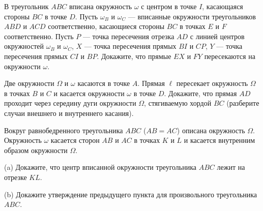 \newpage

\hspace{3mm}

В треугольник $ABC$ вписана окружность $\omega$ с центром в точке $I$,
касающаяся стороны $BC$ в точке $D$. Пусть $\omega_B$ и $\omega_C$ —
вписанные окружности треугольников $ABD$ и $ACD$ соответственно,
касающиеся стороны $BC$ в точках $E$ и $F$ соответственно. Пусть $P$ —
точка пересечения отрезка $AD$ с линией центров окружностей $\omega_B$ и
$\omega_C$, $X$ — точка пересечения прямых $BI$ и $CP$, $Y$ — точка
пересечения прямых $CI$ и $BP$. Докажите, что прямые $EX$ и $FY$
пересекаются на окружности $\omega$.

Две окружности $\Omega$ и $\omega$ касаются в точке $A$. Прямая $\ell$
пересекает окружность $\Omega$ в точках $B$ и $C$ и касается окружности
$\omega$ в точке $D$. Докажите, что прямая $AD$ проходит через середину
дуги окружности $\Omega$, стягиваемую хордой $BC$ (разберите случаи
внешнего и внутреннего касания).\

Вокруг равнобедренного треугольника $ABC$ ($AB=AC$) описана окружность
$\Omega$. Окружность $\omega$ касается сторон $AB$ и $AC$ в точках $K$ и
$L$ и касается внутренним образом окружности $\Omega$. 

(a) Докажите, что центр вписанной окружности треугольника $ABC$ лежит на отрезке $KL$.\

(b) Докажите утверждение предыдущего пункта для произвольного треугольника
$ABC$.